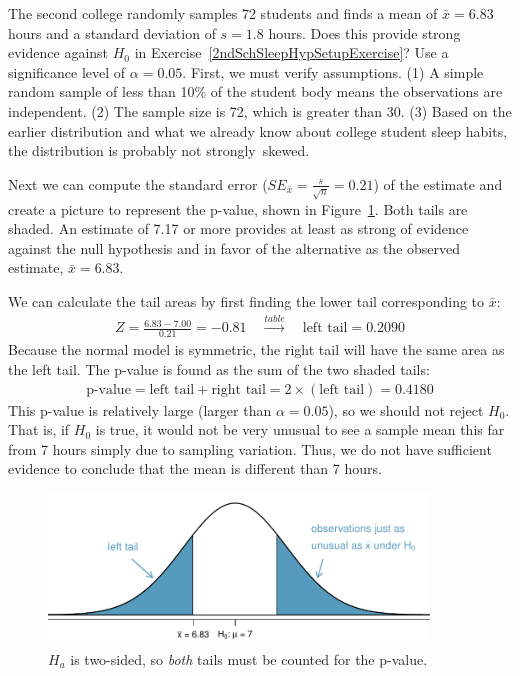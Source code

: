 \begin{example}{The second college randomly samples 72 students and finds a mean of $\bar{x} = 6.83$ hours and a standard deviation of $s=1.8$ hours. Does this provide strong evidence against $H_0$ in Exercise~\ref{2ndSchSleepHypSetupExercise}? Use a significance level of $\alpha=0.05$.}
First, we must verify assumptions. (1) A simple random sample of less than 10\% of the student body means the observations are independent. (2) The sample size is 72, which is greater than 30. (3) Based on the earlier distribution and what we already know about college student sleep habits, the distribution is probably not strongly~skewed.

Next we can compute the standard error ($SE_{\bar{x}} = \frac{s}{\sqrt{n}} = 0.21$) of the estimate and create a picture to represent the p-value, shown in Figure~\ref{2ndSchSleepHTExample}. Both tails are shaded. An estimate of 7.17 or more provides at least as strong of evidence against the null hypothesis and in favor of the alternative as the observed estimate, $\bar{x} = 6.83$.

We can calculate the tail areas by first finding the lower tail corresponding to $\bar{x}$:
\begin{eqnarray*}
Z = \frac{6.83 - 7.00}{0.21} = -0.81 \quad\stackrel{table}{\rightarrow}\quad \text{left tail}=0.2090
\end{eqnarray*}
Because the normal model is symmetric, the right tail will have the same area as the left tail. The p-value is found as the sum of the two shaded tails:
\begin{eqnarray*}
\text{p-value} = \text{left tail} + \text{right tail} = 2\times(\text{left tail}) = 0.4180
\end{eqnarray*}
This p-value is relatively large (larger than $\alpha=0.05$), so we should not reject $H_0$. That is, if $H_0$ is true, it would not be very unusual to see a sample mean this far from 7 hours simply due to sampling variation. Thus, we do not have sufficient evidence to conclude that the mean is different than 7 hours.


\begin{figure}
   \centering
   \includegraphics[width=0.9\textwidth]{04/figures/2ndSchSleepHTExample/2ndSchSleepHTExample}
   \caption{$H_a$ is two-sided, so \emph{both} tails must be counted for the p-value.}
   \label{2ndSchSleepHTExample}
\end{figure}

\end{example}

